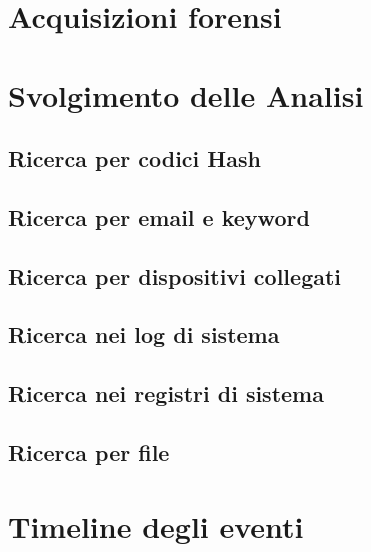 \documentclass[a4paper,12pt]{report}
\begin{document}
\pagebreak

\chapter{Acquisizioni forensi}


\pagebreak

\chapter{Svolgimento delle Analisi}


\section{Ricerca per codici Hash}


\section{Ricerca per email e keyword}


\section{Ricerca per dispositivi collegati}


\section{Ricerca nei log di sistema}


\section{Ricerca nei registri di sistema}


\section{Ricerca per file}


\pagebreak

\chapter{Timeline degli eventi}




\end{document}
